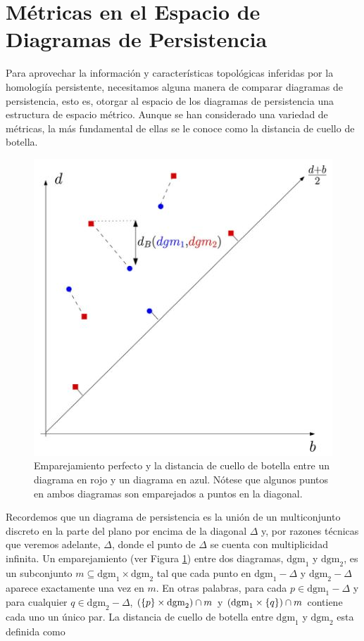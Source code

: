 \section{M\'etricas en el Espacio de Diagramas de Persistencia}
Para aprovechar la informaci\'on y caracter\'isticas topol\'ogicas inferidas por la
homologi\'ia persistente, necesitamos alguna manera de comparar diagramas de persistencia,
esto es, otorgar al espacio de los diagramas de persistencia una estructura de espacio m\'etrico.
Aunque se han considerado una variedad de m\'etricas, la m\'as fundamental de ellas se le conoce como
la distancia de cuello de botella.

\begin{figure}[ht]
    \centering
    \includegraphics[width=0.85\linewidth]{./figures/Figura13.JPG}
    \caption{
        Emparejamiento perfecto y la distancia de cuello de botella entre un
        diagrama en rojo y un diagrama en azul. N\'otese que algunos puntos
        en ambos diagramas son emparejados a puntos en la diagonal.
    }
    \label{fig:Figura 13}
    \vspace{15pt}
\end{figure}

Recordemos que un diagrama de persistencia es la uni\'on de un multiconjunto discreto
en la parte del plano por encima de la diagonal $\Delta$ y,
por razones t\'ecnicas que veremos adelante,
$\Delta$, donde el punto de $\Delta$ se cuenta con multiplicidad infinita.
Un emparejamiento (ver Figura \ref{fig:Figura 13}) entre dos diagramas,
$\mathrm{dgm}_{1}$ y $\mathrm{dgm}_{2}$, es un subconjunto
$m\subseteq\mathrm{dgm}_{1}\times\mathrm{dgm}_{2}$ tal que cada punto en
$\mathrm{dgm}_{1} - \Delta$ y $\mathrm{dgm}_{2} - \Delta$ aparece exactamente
una vez en $m$.
En otras palabras, para cada $p\in\mathrm{dgm}_{1} - \Delta$ y para cualquier
$q\in\mathrm{dgm}_{2} - \Delta$, $\left(\left\{p\right\}\times\mathrm{dgm}_{2}\right)\cap m$
y $\left(\mathrm{dgm}_{1}\times\left\{q\right\}\right)\cap m$ contiene cada uno un \'unico par.
La distancia de cuello de botella entre $\mathrm{dgm}_{1}$ y $\mathrm{dgm}_{2}$
esta definida como

